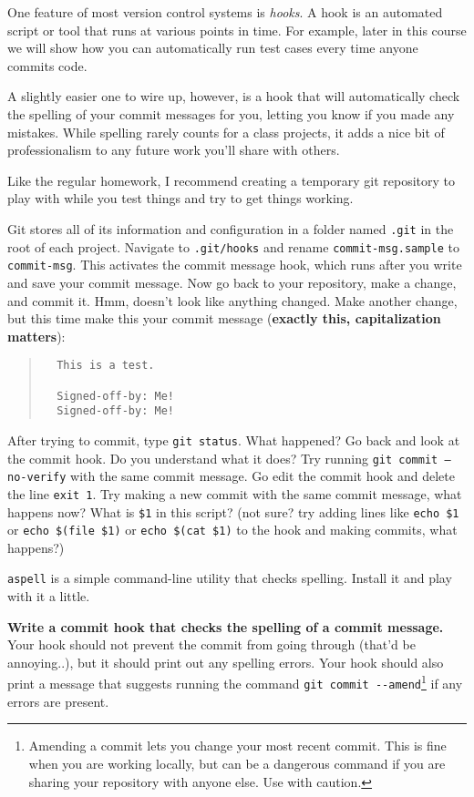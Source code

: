 \documentclass{article}
\begin{document}
One feature of most version control systems is \emph{hooks}. A hook is an
automated script or tool that runs at various points in time. For example,
later in this course we will show how you can automatically run test cases
every time anyone commits code.

\medskip
\noindent
A slightly easier one to wire up, however, is a hook that will automatically
check the spelling of your commit messages for you, letting you know if you
made any mistakes. While spelling rarely counts for a class projects, it
adds a nice bit of professionalism to any future work you'll share with
others.

\medskip
\noindent
Like the regular homework, I recommend creating a temporary git repository to
play with while you test things and try to get things working.

\medskip
\noindent
Git stores all of its information and configuration in a folder named
\texttt{.git} in the root of each project. Navigate to \texttt{.git/hooks} and
rename \texttt{commit-msg.sample} to \texttt{commit-msg}. This activates the
commit message hook, which runs after you write and save your commit message.
Now go back to your repository, make a change, and commit it. Hmm, doesn't
look like anything changed. Make another change, but this time make this your
commit message (\textbf{exactly this, capitalization matters}):
\begin{quote}
  \begin{verbatim}
  This is a test.

  Signed-off-by: Me!
  Signed-off-by: Me!\end{verbatim}
\end{quote}
After trying to commit, type \texttt{git status}. What happened? Go back and
look at the commit hook. Do you understand what it does? Try running
\texttt{git commit --no-verify} with the same commit message. Go edit the
commit hook and delete the line \texttt{exit 1}. Try making a new commit with
the same commit message, what happens now? What is \texttt{\$1} in this
script?  (not sure? try adding lines like \texttt{echo~\$1} or
\texttt{echo~\$(file~\$1)} or \texttt{echo~\$(cat~\$1)} to the hook and making
commits, what happens?)

\medskip
\noindent
\texttt{aspell} is a simple command-line utility that checks spelling. Install
it and play with it a little.

\medskip
\noindent
\textbf{Write a commit hook that checks the spelling of a commit message.}
Your hook should not prevent the commit from going through (that'd be
annoying..), but it should print out any spelling errors. Your hook should
also print a message that suggests running the command
\texttt{git~commit~-{}-amend}\footnote{
  Amending a commit lets you change your most recent commit. This is fine when
  you are working locally, but can be a dangerous command if you are sharing
  your repository with anyone else. Use with caution.
} if any errors are present.
\end{document}
